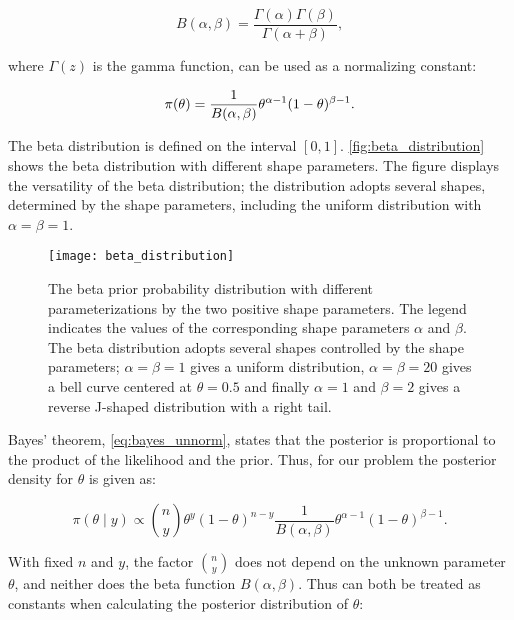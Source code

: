 \begin{equation*}
    B (\alpha, \beta) = \frac{\Gamma(\alpha)\Gamma(\beta)}{\Gamma(\alpha + \beta)},
\end{equation*}

where $\Gamma (z)$ is the gamma function, can be used as a normalizing constant:

\begin{equation}\label{eq:beta_prior}
    \pi \qty(\theta) = \frac{1}{B(\alpha, \beta)} \theta^{\alpha -1} (1-\theta)^{\beta -1}.
\end{equation}

The beta distribution is defined on the interval $[0, 1]$. \autoref{fig:beta_distribution} shows the beta distribution with different shape parameters. The figure displays the versatility of the beta distribution; the distribution adopts several shapes, determined by the shape parameters, including the uniform distribution with $\alpha = \beta = 1$. 

\begin{figure}[ht]
    \centering
    \texttt{[image: beta\_distribution]}
    \caption{The beta prior probability distribution with different parameterizations by the two positive shape parameters. The legend indicates the values of the corresponding shape parameters $\alpha$ and $\beta$. The beta distribution adopts several shapes controlled by the shape parameters; $\alpha=\beta=1$ gives a uniform distribution, $\alpha=\beta=20$ gives a bell curve centered at $\theta=0.5$ and finally $\alpha=1$ and $\beta=2$ gives a reverse J-shaped distribution with a right tail.
    }
    \label{fig:beta_distribution}
\end{figure} 



Bayes' theorem, \autoref{eq:bayes_unnorm}, states that the posterior is proportional to the product of the likelihood and the prior. Thus, for our problem the posterior density for $\theta$ is given as: 

\begin{equation*}
    \pi (\theta \mid y) \propto \binom{n}{y} \theta^y (1-\theta)^{n-y} \frac{1}{B(\alpha, \beta)} \theta^{\alpha-1}(1-\theta)^{\beta -1}.
\end{equation*}

With fixed $n$ and $y$, the factor $\binom{n}{y}$ does not depend on the unknown parameter $\theta$, and neither does the beta function $B(\alpha, \beta)$. Thus can both be treated as constants when calculating the posterior distribution of $\theta$:

